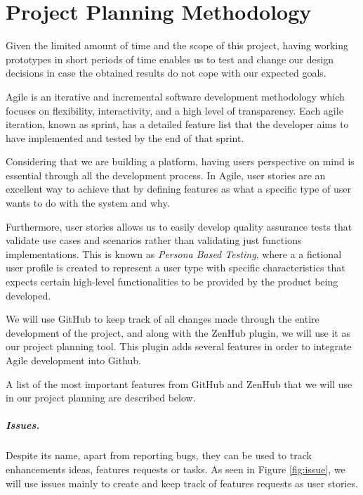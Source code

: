 \chapter{Project Planning Methodology}

Given the limited amount of time and the scope of this project, having working prototypes in short periods of time enables us to test and change our design decisions in case the obtained results do not cope with our expected goals.  

Agile is an iterative and incremental software development methodology which focuses on flexibility, interactivity, and a high level of transparency. Each agile iteration, known as sprint, has a detailed feature list that the developer aims to have implemented and tested by the end of that sprint.

Considering that we are building a platform, having users perspective on mind is essential through all the development process. In Agile, user stories are an excellent way to achieve that by defining features as what a specific type of user wants to do with the system and why. 

Furthermore, user stories allows us to easily develop quality assurance tests that validate use cases and scenarios rather than validating just functions implementations. This is known as \textit{Persona Based Testing}, where a a fictional user profile is created to represent a user type with specific characteristics that expects certain high-level functionalities to be provided by the product being developed.

We will use GitHub \cite{github} to keep track of all changes made through the entire development of the project, and along with the ZenHub \cite{zenhub} plugin, we will use it as our project planning tool. This plugin adds several features in order to integrate Agile development into Github. 

A list of the most important features from GitHub and ZenHub that we will use in our project planning are described below.

\paragraph*{Issues.} Despite its name, apart from reporting bugs, they can be used to track enhancements ideas, features requests or tasks. As seen in Figure \ref{fig:issue}, we will use issues mainly to create and keep track of features requests as user stories. 

